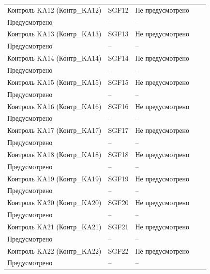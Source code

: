 \begin{longtable}{|>{\centering\arraybackslash}m{5.3cm}|>{\centering\arraybackslash}m{3.3cm}|>{\centering\arraybackslash}m{4.2cm}|>{\centering\arraybackslash}m{1.8cm}|>{\centering\arraybackslash}m{1cm}|}
\hline
\centering Контроль KA12 (Контр\_KA12)  & \centering SGF12 & \centering Не предусмотрено \\ Предусмотрено & \centering -- & \centering \arraybackslash -- \\
\hline
\centering Контроль KA13 (Контр\_KA13)  & \centering SGF13 & \centering Не предусмотрено \\ Предусмотрено & \centering -- & \centering \arraybackslash -- \\
\hline
\centering Контроль KA14 (Контр\_KA14)  & \centering SGF14 & \centering Не предусмотрено \\ Предусмотрено & \centering -- & \centering \arraybackslash -- \\
\hline
\centering Контроль KA15 (Контр\_KA15)  & \centering SGF15 & \centering Не предусмотрено \\ Предусмотрено & \centering -- & \centering \arraybackslash -- \\
\hline
\centering Контроль KA16 (Контр\_KA16)  & \centering SGF16 & \centering Не предусмотрено \\ Предусмотрено & \centering -- & \centering \arraybackslash -- \\
\hline
\centering Контроль KA17 (Контр\_KA17)  & \centering SGF17 & \centering Не предусмотрено \\ Предусмотрено & \centering -- & \centering \arraybackslash -- \\
\hline
\centering Контроль KA18 (Контр\_KA18)  & \centering SGF18 & \centering Не предусмотрено \\ Предусмотрено & \centering -- & \centering \arraybackslash -- \\
\hline
\centering Контроль KA19 (Контр\_KA19)  & \centering SGF19 & \centering Не предусмотрено \\ Предусмотрено & \centering -- & \centering \arraybackslash -- \\
\hline
\centering Контроль KA20 (Контр\_KA20)  & \centering SGF20 & \centering Не предусмотрено \\ Предусмотрено & \centering -- & \centering \arraybackslash -- \\
\hline
\centering Контроль KA21 (Контр\_KA21)  & \centering SGF21 & \centering Не предусмотрено \\ Предусмотрено & \centering -- & \centering \arraybackslash -- \\
\hline
\centering Контроль KA22 (Контр\_KA22)  & \centering SGF22 & \centering Не предусмотрено \\ Предусмотрено & \centering -- & \centering \arraybackslash -- \\

\end{longtable}
